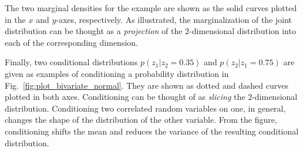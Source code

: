 The two marginal densities for the example are shown as the solid curves plotted in the $x$ and $y$-axes, respectively.
As illustrated, the marginalization of the joint distribution can be thought as a \emph{projection} of the $2$-dimensional distribution into each of the corresponding dimension.

Finally, two conditional distributions $p(z_1|z_2=0.35)$ and $p(z_2|z_1=0.75)$ are given as examples of conditioning a probability distribution in Fig.~\ref{fig:plot_bivariate_normal}.
They are shown as dotted and dashed curves plotted in both axes.
Conditioning can be thought of as \emph{slicing} the $2$-dimensional distribution.
Conditioning two correlated random variables on one, in general, changes the shape of the distribution of the other variable.
From the figure, conditioning shifts the mean and reduces the variance of the resulting conditional distribution. 

